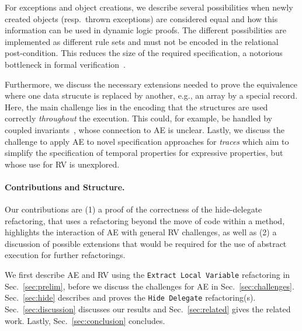 For exceptions and object creations, we describe several possibilities when newly created objects (resp.\ thrown exceptions) are considered equal
and how this information can be used in dynamic logic proofs. The different possibilities are implemented as different rule sets and must not be encoded
in the relational post-condition. This reduces the size of the required specification, a notorious bottleneck in formal verification~\cite{DBLP:journals/corr/abs-1211-6186,DBLP:series/lncs/HahnleH19}.


Furthermore, we discuss the necessary extensions needed to prove the equivalence where one data strucute is replaced by another, e.g., an array by a special record.
Here, the main challenge lies in the encoding that the structures are used correctly \emph{throughout} the execution. This could, for example, be handled by coupled invariants~\cite{DBLP:conf/birthday/BeckertU18}, whose connection to AE is unclear. 
Lastly, we discuss the challenge to apply AE to novel specification approaches for \emph{traces} which aim to simplify the specification of temporal properties for expressive properties, but whose use for RV is unexplored.

\paragraph{Contributions and Structure.}
Our contributions are (1) a proof of the correctness of the hide-delegate refactoring, that uses a refactoring beyond the move of code within a method, highlights the interaction of AE with general RV challenges, as well as (2) a discussion of possible extensions that would be required for the use of abstract execution for further refactorings.

We first describe AE and RV using the \texttt{Extract Local Variable} refactoring in Sec.~\ref{sec:prelim}, before we discuss the challenges for AE in Sec.~\ref{sec:challenges}. Sec.~\ref{sec:hide} describes and proves the \texttt{Hide Delegate} refactoring(s). Sec.~\ref{sec:discussion} discusses our results and Sec.~\ref{sec:related} gives the related work. Lastly, Sec.~\ref{sec:conclusion} concludes.



